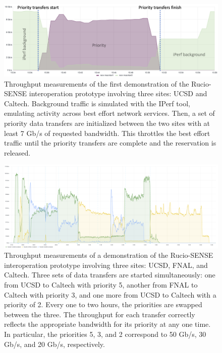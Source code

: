 \begin{figure}[htb]
    \centering
    \includegraphics[width=.9\textwidth]{fig/cyber/rucio-sense_demo.png}
    \caption[Rucio-SENSE interoperation throughput with 2 sites in the testbed.]{
        Throughput measurements of the first demonstration of the Rucio-SENSE interoperation prototype involving three sites: UCSD and Caltech. 
        Background traffic is simulated with the IPerf tool, emulating activity across best effort network services. 
        Then, a set of priority data transfers are initialized between the two sites with at least 7 Gb/s of requested bandwidth. 
        This throttles the best effort traffic until the priority transfers are complete and the reservation is released. 
    }
    \label{fig:rucio_sense_demo}
\end{figure}

\begin{figure}[htb]
    \centering
    \includegraphics[width=.9\textwidth]{fig/cyber/rucio-sense_demo_big.png}
    \caption[Rucio-SENSE interoperation throughput with 3 sites in the testbed.]{
        Throughput measurements of a demonstration of the Rucio-SENSE interoperation prototype involving three sites: UCSD, FNAL, and Caltech. 
        Three sets of data transfers are started simultaneously: one from UCSD to Caltech with priority 5, another from FNAL to Caltech with priority 3, and one more from UCSD to Caltech with a priority of 2. 
        Every one to two hours, the priorities are swapped between the three. 
        The throughput for each transfer correctly reflects the appropriate bandwidth for its priority at any one time. 
        In particular, the priorities 5, 3, and 2 correspond to 50 Gb/s, 30 Gb/s, and 20 Gb/s, respectively.
      }
    \label{fig:rucio_sense_demo_big}
\end{figure}

